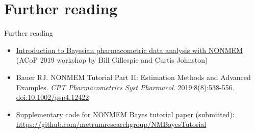 \documentclass[handout]{beamer}
\begin{document}



\section{Further reading}

\begin{frame}{Further reading}

  \begin{itemize}
    \item \href{https://metrumrg.com/course/introduction-to-bayesian-pharmacometric-data-analysis-with-nonmem/}{Introduction to Bayesian pharmacometric data analysis with NONMEM} (ACoP 2019 workshop by Bill Gillespie and Curtis Johnston)
    \item Bauer RJ. NONMEM Tutorial Part II: Estimation Methods and Advanced Examples. \emph{CPT Pharmacometrics Syst Pharmacol}. 2019;8(8):538-556. \href{https://doi.org/10.1002/psp4.12422}{doi:10.1002/psp4.12422}
    \item Supplementary code for NONMEM Bayes tutorial paper (submitted): \url{https://github.com/metrumresearchgroup/NMBayesTutorial}
  \end{itemize}
\end{frame}
\end{document}
